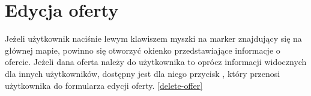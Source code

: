 \section{Edycja oferty}
Jeżeli użytkownik naciśnie lewym klawiszem myszki na marker znajdujący się na głównej mapie, powinno się otworzyć okienko przedstawiające informacje o ofercie. Jeżeli dana oferta należy do użytkownika to oprócz informacji widocznych dla innych użytkowników, dostępny jest dla niego przycisk , który przenosi użytkownika do formularza edycji oferty. \ref{delete-offer}\\
\\
\begin{minipage}{\linewidth}
\label{edit-offer}
\end{minipage}\\

